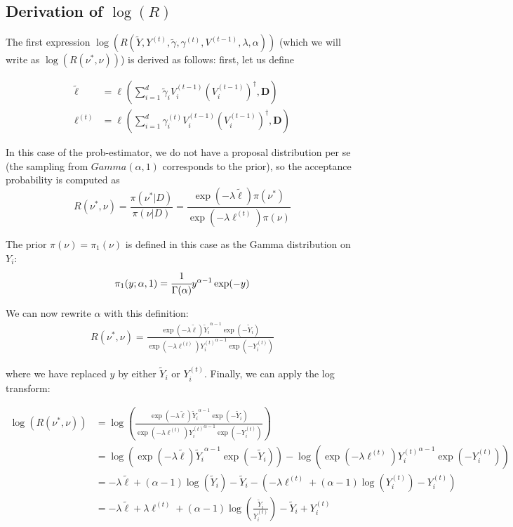 \documentclass[12pt]{memoir}
\newcommand{\mb}{\mathbf}
\begin{document}
\subsection*{Derivation of $\log(R)$}

The first expression $\log(R(\tilde Y, Y^{(t)}, \tilde \gamma, \gamma^{(t)}, V^{(t-1)}, \lambda, \alpha))$ (which we will write as $\log(R(\nu^*, \nu))$) is derived as follows: first, let us define

\begin{align}
    \tilde \ell &= \ell^{}(\sum_{i=1}^{d} \tilde \gamma_i V_i^{(t-1)} (V_i^{(t-1)})^\dagger, \mb D)\\
    \ell^{(t)} &= \ell^{}(\sum_{i=1}^{d} \gamma_i^{(t)} V_i^{(t-1)} (V_i^{(t-1)})^\dagger, \mb D)
\end{align}

In this case of the prob-estimator, we do not have a proposal distribution per se (the sampling from $Gamma(\alpha, 1)$ corresponds to the prior), so the acceptance probability is computed as
\begin{equation}
    R(\nu^*, \nu) = \frac{\pi(\nu^*|D)}{\pi(\nu|D)} = \frac{\exp(-\lambda \tilde\ell) \pi(\nu^*)}{\exp(-\lambda \ell^{(t)})\pi(\nu)}
\end{equation}

The prior $\pi(\nu) = \pi_1(\nu)$ is defined in this case as the Gamma distribution on $Y_i$:
\begin{equation}
    \pi_1(y;\alpha, 1) = \cfrac{1}{\Gamma(\alpha)}y^{\alpha - 1} \exp(-y)
\end{equation}

We can now rewrite $\alpha$ with this definition:
\begin{align}
    R(\nu^*, \nu) = \frac{\exp(-\lambda \tilde\ell) {\tilde Y_i}^{\alpha - 1} \exp(-\tilde Y_i)}{\exp(-\lambda \ell^{(t)}) {Y_i^{(t)}}^{\alpha - 1} \exp(-Y_i^{(t)})}
\end{align}

where we have replaced $y$ by either $\tilde Y_i$ or $Y^{(t)}_i$. Finally, we can apply the log transform:

\begin{align}
    \log(R(\nu^*, \nu)) &= \log\left(\frac{\exp(-\lambda \tilde\ell) {\tilde Y_i}^{\alpha - 1} \exp(-\tilde Y_i)}{\exp(-\lambda \ell^{(t)}) {Y_i^{(t)}}^{\alpha - 1} \exp(-Y_i^{(t)})}\right)\\
    &= \log(\exp(-\lambda \tilde\ell) {\tilde Y_i}^{\alpha - 1} \exp(-\tilde Y_i)) - \log(\exp(-\lambda \ell^{(t)}) {Y_i^{(t)}}^{\alpha - 1} \exp(-Y_i^{(t)}))\\
    &= -\lambda \tilde \ell + (\alpha - 1)\log(\tilde Y_i) - \tilde Y_i - (-\lambda \ell^{(t)} + (\alpha - 1)\log(Y_i^{(t)}) - Y_i^{(t)})\\
    &= -\lambda \tilde \ell + \lambda \ell^{(t)} + (\alpha -1)\log(\frac{\tilde Y_i}{Y_i^{(t)}}) - \tilde Y_i + Y_i^{(t)}
\end{align}
\end{document}
